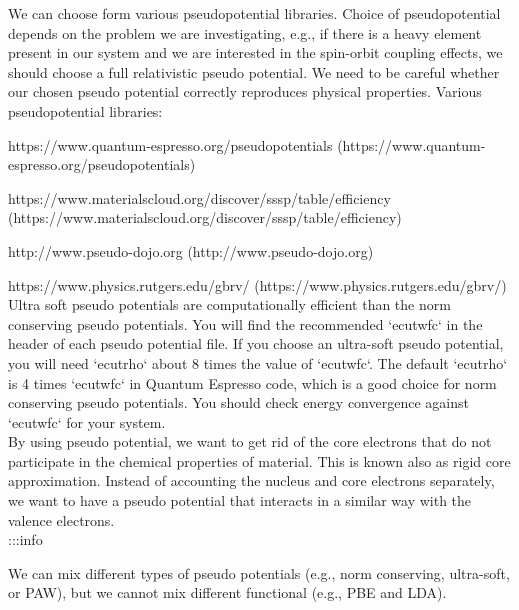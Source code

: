 \documentclass{article}
\begin{document}
We can choose form various pseudopotential libraries. Choice of pseudopotential
depends on the problem we are investigating, e.g., if there is a heavy element
present in our system and we are interested in the spin-orbit coupling effects,
we should choose a full relativistic pseudo potential. We need to be careful
whether our chosen pseudo potential correctly reproduces physical properties.
Various pseudopotential libraries:\\

\item{https://www.quantum-espresso.org/pseudopotentials (https://www.quantum-espresso.org/pseudopotentials)}
\item{https://www.materialscloud.org/discover/sssp/table/efficiency\\
(https://www.materialscloud.org/discover/sssp/table/efficiency)}\\
\item {http://www.pseudo-dojo.org (http://www.pseudo-dojo.org)}\\
\item{https://www.physics.rutgers.edu/gbrv/ (https://www.physics.rutgers.edu/gbrv/)}\\

Ultra soft pseudo potentials are computationally efficient than the norm
conserving pseudo potentials. You will find the recommended `ecutwfc` in the
header of each pseudo potential file. If you choose an ultra-soft pseudo
potential, you will need `ecutrho` about 8 times the value of `ecutwfc`. The
default `ecutrho` is 4 times `ecutwfc` in Quantum Espresso code, which is a
good choice for norm conserving pseudo potentials. You should check energy
convergence against `ecutwfc` for your system.\\

By using pseudo potential, we want to get rid of the core electrons that do not
participate in the chemical properties of material. This is known also as rigid
core approximation. Instead of accounting the nucleus and core electrons
separately, we want to have a pseudo potential that interacts in a similar way
with the valence electrons.\\

:::info

\item We can mix different types of pseudo potentials (e.g., norm conserving,
ultra-soft, or PAW), but we cannot mix different functional (e.g., PBE and LDA).\\
\end{document}
